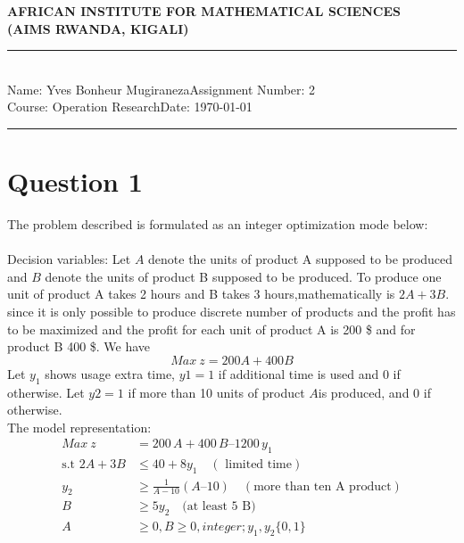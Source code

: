 \documentclass[12pt,a4paper]{article}
\newcommand{\student}{Yves Bonheur Mugiraneza}
\newcommand{\course}{Operation Research}
\newcommand{\assignment}{2}
\begin{document}
	
	\thispagestyle{empty}
	\begin{center}
		\textbf{AFRICAN INSTITUTE FOR MATHEMATICAL SCIENCES \\[0.5cm]
			(AIMS RWANDA, KIGALI)}
		\vspace{1.0cm}
	\end{center}
	
	\noindent
	\rule{17cm}{0.2cm}\\[0.3cm]
	Name: \student \hfill Assignment Number: \assignment\\[0.1cm]
	Course: \course \hfill Date: \today\\
	\rule{17cm}{0.05cm}
	\vspace{1.0cm}
	
	\section*{Question 1}
	The problem described is formulated as an integer optimization mode below:\\
	\\
    Decision variables:
    Let $A$ denote the units of product A supposed to be produced and $B$ denote the units of product B supposed to be produced. To produce one unit of product A takes 2 hours and B takes 3 hours,mathematically is $2A+3B$. since it is only possible to produce discrete number of products and the profit has to be maximized and the profit for each unit of product A is 200 \$ and for product B 400 \$. We have $$Max~ z = 200 A + 400 B$$
    Let $y_1$ shows usage extra time, $y1=1$ if additional time is used and 0 if otherwise.
    Let $y2=1$ if more than 10 units of product $A $is produced, and 0 if otherwise. \\
    The model representation:\\

    \begin{align*}
        Max ~z &= 200\,A + 400\,B – 1200\,y_1\\
        \text{s.t } 2A + 3 B    &\leq  40 + 8y_1 \quad(\text{ limited time})\\
        y_2 &\geq \frac{1}{A-10} (A – 10) \quad  (\text{more than ten A product})\\
        B &\geq 5y_2 \quad \text{(at least 5 B)}\\
        A &\geq 0, B \geq 0, integer; y_1, y_2 \{0,1\}
    \end{align*}
	\newpage
\end{document}
